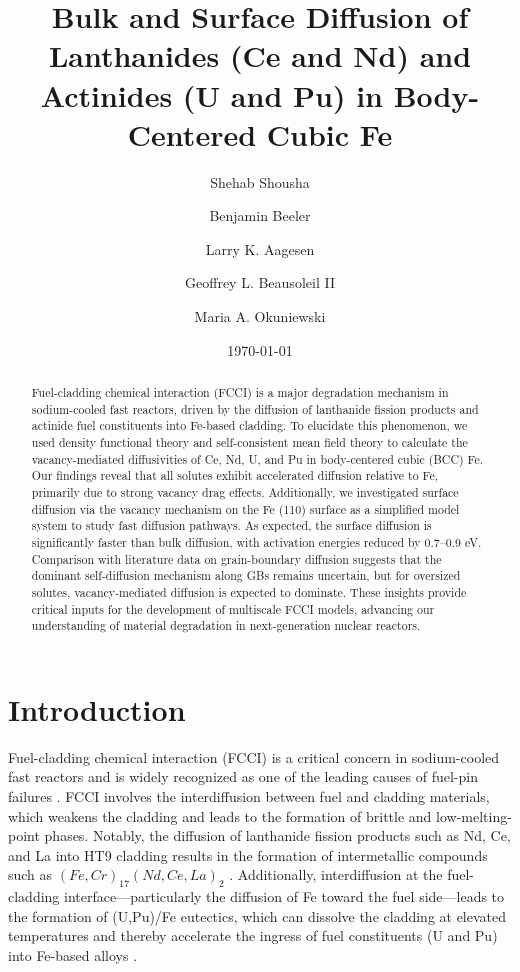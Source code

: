 \documentclass[preprint,12pt]{elsarticle}
\title{Bulk and Surface Diffusion of Lanthanides (Ce and  Nd) and Actinides (U and Pu) in Body-Centered Cubic Fe}
\author[inst1]{Shehab Shousha}
\affiliation[inst1]{organization={North Carolina State University},%
            city={Raleigh},
            state={NC},
            postcode={27695}, 
            country={United States}}
\author[inst1,inst2]{Benjamin Beeler}
\affiliation[inst2]{organization={Idaho National Laboratory},%
            city={Idaho Falls},
            state={ID},
            postcode={83415}, 
            country={United States}}
\author[inst2,inst3]{Larry K. Aagesen}
\affiliation[inst3]{organization={Department of Nuclear Engineering and Radiological Sciences, University of Michigan},%
            city={Ann Arbor},
            state={MI},
            postcode={48109}, 
            country={United States}}
\author[inst2]{Geoffrey L. Beausoleil II}
\author[inst4]{Maria A. Okuniewski}
\affiliation[inst4]{organization={Purdue University},%
            city={West Lafayette},
            state={IN},
            postcode={47907}, 
            country={United States}}
\date{\today}
\begin{document}
\begin{abstract}
Fuel-cladding chemical interaction (FCCI) is a major degradation mechanism in sodium-cooled fast reactors, driven by the diffusion of lanthanide fission products and actinide fuel constituents into Fe-based cladding.  To elucidate this phenomenon, we used density functional theory and self-consistent mean field theory to calculate the vacancy-mediated diffusivities of Ce, Nd, U, and Pu in body-centered cubic (BCC) Fe. Our findings reveal that all solutes exhibit accelerated diffusion relative to Fe, primarily due to strong vacancy drag effects. Additionally, we investigated surface diffusion via the vacancy mechanism on the Fe (110) surface as a simplified model system to study fast diffusion pathways. As expected, the surface diffusion is significantly faster than bulk diffusion, with activation energies reduced by 0.7–0.9 eV. Comparison with literature data on grain-boundary diffusion suggests that the dominant self-diffusion mechanism along GBs remains uncertain, but for oversized solutes, vacancy-mediated diffusion is expected to dominate. These insights provide critical inputs for the development of multiscale FCCI models, advancing our understanding of material degradation in next-generation nuclear reactors. 
\end{abstract}

\maketitle

\section{Introduction}

\noindent Fuel-cladding chemical interaction (FCCI) is a critical concern in sodium-cooled fast reactors \cite{hofman_metallic_1997, pahl_experimental_1990, thomas_nano-mechanical_2021} and is widely recognized as one of the leading causes of fuel-pin failures \cite{matthews_fuel-cladding_2017}. FCCI involves the interdiffusion between fuel and cladding materials, which weakens the cladding and leads to the formation of brittle and low-melting-point phases. Notably, the diffusion of lanthanide fission products such as Nd, Ce, and La into HT9 cladding results in the formation of intermetallic compounds such as $(Fe, Cr)_{17}(Nd, Ce, La)_{2}$ \cite{keiser_fuel-cladding_2006, harp_scanning_2017}. Additionally, interdiffusion at the fuel-cladding interface—particularly the diffusion of Fe toward the fuel side—leads to the formation of (U,Pu)/Fe eutectics, which can dissolve the cladding at elevated temperatures and thereby accelerate the ingress of fuel constituents (U and Pu) into Fe-based alloys \cite{matthews_fuel-cladding_2017, keiser2009development, cohen1993fuel}.
\end{document}
